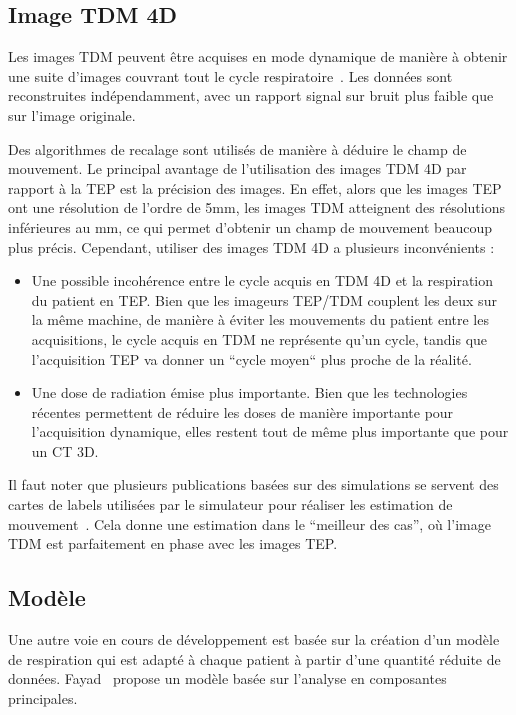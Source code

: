 \subsection{Image TDM 4D}

Les images TDM peuvent être acquises en mode dynamique de manière à obtenir une suite d'images couvrant tout le cycle respiratoire~\cite{lamare2007list, qiao2006motion}. Les données sont reconstruites indépendamment, avec un rapport signal sur bruit plus faible que sur l'image originale. 

Des algorithmes de recalage sont utilisés de manière à déduire le champ de mouvement. Le principal avantage de l'utilisation des images TDM 4D par rapport à la TEP est la précision des images. En effet, alors que les images TEP ont une résolution de l'ordre de 5mm, les images TDM atteignent des résolutions inférieures au mm, ce qui permet d'obtenir un champ de mouvement beaucoup plus précis. Cependant, utiliser des images TDM 4D a plusieurs inconvénients :

\begin{itemize}
 \item Une possible incohérence entre le cycle acquis en TDM 4D et la respiration du patient en TEP. Bien que les imageurs TEP/TDM couplent les deux sur la même machine, de manière à éviter les mouvements du patient entre les acquisitions, le cycle acquis en TDM ne représente qu'un cycle, tandis que l'acquisition TEP va donner un ``cycle moyen`` plus proche de la réalité.
 \item Une dose de radiation émise plus importante. Bien que les technologies récentes permettent de réduire les doses de manière importante pour l'acquisition dynamique, elles restent tout de même plus importante que pour un CT 3D.
\end{itemize}

Il faut noter que plusieurs publications basées sur des simulations se servent des cartes de labels utilisées par le simulateur pour réaliser les estimation de mouvement~\cite{lamare2007list}. Cela donne une estimation dans le ``meilleur des cas'', où l'image TDM est parfaitement en phase avec les images TEP.

\subsection{Modèle}

Une autre voie en cours de développement est basée sur la création d'un modèle de respiration qui est adapté à chaque patient à partir d'une quantité réduite de données. Fayad~\cite{fayad2010application} propose un modèle basée sur l'analyse en composantes principales. 

